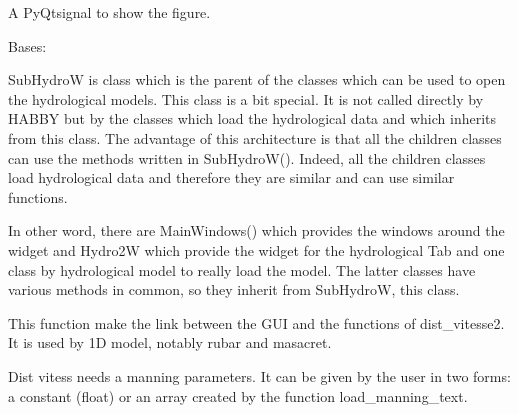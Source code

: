\documentclass[letterpaper,10pt,english]{sphinxmanual}
\begin{document}
\begin{fulllineitems}
\begin{fulllineitems}
\end{fulllineitems}


\begin{fulllineitems}
\label{\detokenize{index:src_GUI.hydro_GUI_2.Rubar2D.show_fig}}
A PyQtsignal to show the figure.

\end{fulllineitems}


\end{fulllineitems}


\begin{fulllineitems}
\label{\detokenize{index:src_GUI.hydro_GUI_2.SubHydroW}}
Bases: 

SubHydroW is class which is the parent of the classes which can be used to open the hydrological models. This class
is a bit special. It is not called directly by HABBY but by the classes which load the hydrological data and which
inherits from this class. The advantage of this architecture is that all the children classes can use the methods
written in SubHydroW(). Indeed, all the children classes load hydrological data and therefore they are similar and can use
similar functions.

In other word, there are MainWindows() which provides the windows around the widget and Hydro2W which provide the widget for the
hydrological Tab and one class by hydrological model to really load the model. The latter classes have various
methods in common, so they inherit from SubHydroW, this class.

\begin{fulllineitems}
\label{\detokenize{index:src_GUI.hydro_GUI_2.SubHydroW.distribute_velocity}}
This function make the link between the GUI and the functions of dist\_vitesse2. It is used by 1D model,
notably rubar and masacret.

Dist vitess needs a manning parameters. It can be given by the user in two forms: a constant (float) or an array
created by the function load\_manning\_text.


\end{fulllineitems}
\end{fulllineitems}
\end{document}
